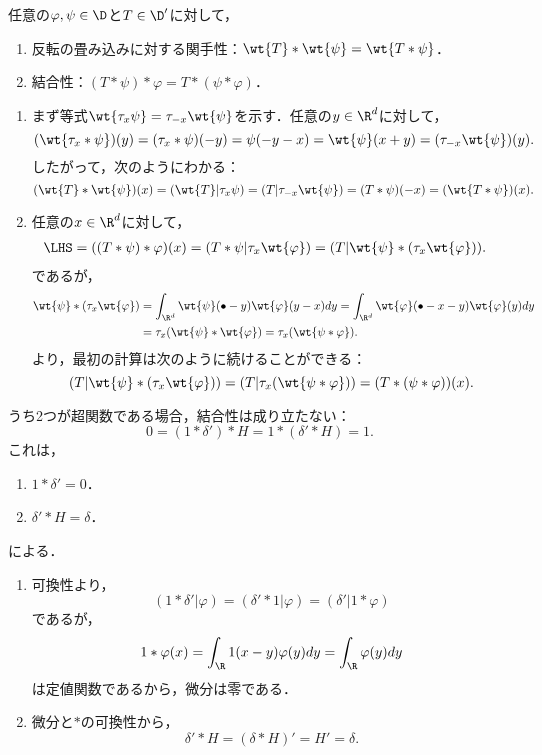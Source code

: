 \documentclass[uplatex,dvipdfmx]{jsreport}
\begin{document}
\begin{proposition}[結合性]\label{prop-associativity-of-convolution-between-distributions}
    任意の$\varphi,\psi\in\D$と$T\in\D'$に対して，
    \begin{enumerate}
        \item 反転の畳み込みに対する関手性：$\wt{T}*\wt{\psi}=\wt{T*\psi}$．
        \item 結合性：$(T*\psi)*\varphi=T*(\psi*\varphi)$．
    \end{enumerate}
\end{proposition}
\begin{Proof}\mbox{}
    \begin{enumerate}
        \item まず等式$\wt{\tau_x\psi}=\tau_{-x}\wt{\psi}$を示す．任意の$y\in\R^d$に対して，
        \[(\wt{\tau_x*\psi})(y)=(\tau_x*\psi)(-y)=\psi(-y-x)=\wt{\psi}(x+y)=(\tau_{-x}\wt{\psi})(y).\]
        したがって，次のようにわかる：
        \[(\wt{T}*\wt{\psi})(x)=(\wt{T}|\tau_x\psi)=(T|\tau_{-x}\wt{\psi})=(T*\psi)(-x)=(\wt{T*\psi})(x).\]
        \item 任意の$x\in\R^d$に対して，
        \begin{align*}
            \LHS=((T*\psi)*\varphi)(x)&=(T*\psi|\tau_x\wt{\varphi})=(T|\wt{\psi}*(\tau_x\wt{\varphi})).
        \end{align*}
        であるが，
        \begin{align*}
            \wt{\psi}*(\tau_x\wt{\varphi})&=\int_{\R^d}\wt{\psi}(\bullet-y)\wt{\varphi}(y-x)dy=\int_{\R^d}\wt{\varphi}(\bullet-x-y)\wt{\varphi}(y)dy\\
            &=\tau_x(\wt{\psi}*\wt{\varphi})=\tau_x(\wt{\psi*\varphi}).
        \end{align*}
        より，最初の計算は次のように続けることができる：
        \[(T|\wt{\psi}*(\tau_x\wt{\varphi}))=(T|\tau_x(\wt{\psi*\varphi}))=(T*(\psi*\varphi))(x).\]
    \end{enumerate}
\end{Proof}

\begin{example}
    うち2つが超関数である場合，結合性は成り立たない：
    \[0=(1*\delta')*H=1*(\delta'*H)=1.\]
    これは，
    \begin{enumerate}
        \item $1*\delta'=0$．
        \item $\delta'*H=\delta$．
    \end{enumerate}
    による．
\end{example}
\begin{Proof}\mbox{}
    \begin{enumerate}
        \item 可換性より，
        \[(1*\delta'|\varphi)=(\delta'*1|\varphi)=(\delta'|1*\varphi)\]
        であるが，
        \[1*\varphi(x)=\int_\R 1(x-y)\varphi(y)dy=\int_\R\varphi(y)dy\]
        は定値関数であるから，微分は零である．
        \item 微分と$*$の可換性から，
        \[\delta'*H=(\delta*H)'=H'=\delta.\]
    \end{enumerate}
\end{Proof}
\end{document}
